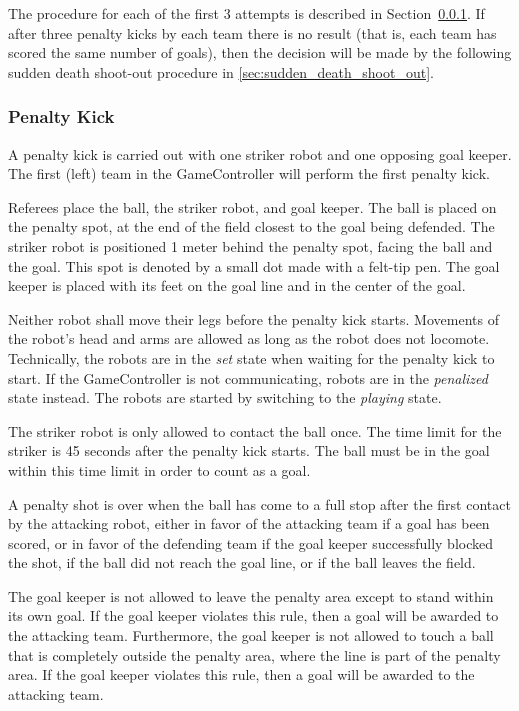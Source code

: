 \documentclass[12pt]{article}
\begin{document}
The procedure for each of the first 3 attempts is described in Section~\ref{sec:penalty_kick}. If after three penalty kicks by each team there is no result (that is, each team has scored the same number of goals), then the decision will be made by the following sudden death shoot-out procedure in \ref{sec:sudden_death_shoot_out}.

\subsubsection{Penalty Kick}
\label{sec:penalty_kick}

A penalty kick is carried out with one striker robot and one opposing goal keeper. The first (left) team in the GameController will perform the first penalty kick.

Referees place the ball, the striker robot, and goal keeper. The ball is placed on the penalty spot, at the end of the field closest to the goal being defended. The striker robot is positioned 1 meter behind the penalty spot, facing the ball and the goal.  This spot is denoted by a small dot made with a felt-tip pen. The goal keeper is placed with its feet on the goal line and in the center of the goal.

Neither robot shall move their legs before the penalty kick starts. Movements of the robot's head and arms are allowed as long as the robot does not locomote. Technically, the robots are in the \emph{set} state when waiting for the penalty kick to start. If the GameController is not communicating, robots are in the \emph{penalized} state instead. The robots are started by switching to the \emph{playing} state.

The striker robot is only allowed to contact the ball once.  The time limit for the striker is 45 seconds after the penalty kick starts. The ball must be in the goal within this time limit in order to count as a goal.

A penalty shot is over when the ball has come to a full stop after the first contact by the attacking robot, either in favor of the attacking team if a goal has been scored, or in favor of the defending team if the goal keeper successfully blocked the shot, if the ball did not reach the goal line, or if the ball leaves the field.

The goal keeper is not allowed to leave the penalty area except to stand within its own goal. If the goal keeper violates this rule, then a goal will be awarded to the attacking team. Furthermore, the goal keeper is not allowed to touch a ball that is completely outside the penalty area, where the line is part of the penalty area. If the goal keeper violates this rule, then a goal will be awarded to the attacking team.
\end{document}
